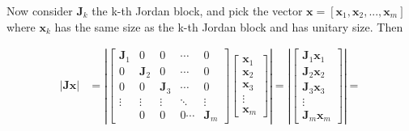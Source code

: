 	Now consider $\mathbf{J}_k$ the k-th Jordan block, and pick the vector $\mathbf{x} = \left[\mathbf{x}_1,\mathbf{x}_2,...,\mathbf{x}_m\right]$ where $\mathbf{x}_k$ has the same size as the k-th Jordan block and has unitary size. Then

\begin{align}
	\left\lvert \mathbf{Jx}\right\rvert &=
	\left\lvert \left[\begin{array}{ccccc} \mathbf{J}_1 & 0 & 0 & \cdots & 0 \\[3mm] 0 & \mathbf{J}_2 & 0 & \cdots & 0 \\[3mm] 0 & 0 & \mathbf{J}_3 & \cdots & 0 \\[3mm] \vdots & \vdots & \vdots & \ddots & \vdots \\[3mm] & 0 & 0 & 0 \cdots & \mathbf{J}_m \end{array}\right] \left[\begin{array}{c} \mathbf{x}_1 \\[3mm] \mathbf{x}_2 \\[3mm] \mathbf{x}_3 \\[3mm] \vdots \\[3mm] \mathbf{x}_m \end{array}\right] \right\rvert =
%
	\left\lvert \left[\begin{array}{c} \mathbf{J}_1\mathbf{x}_1 \\[3mm] \mathbf{J}_2\mathbf{x}_2 \\[3mm] \mathbf{J}_3\mathbf{x}_3 \\[3mm] \vdots \\[3mm] \mathbf{J}_m\mathbf{x}_m \end{array}\right] \right\rvert =  \nonumber\\[3mm]
%

\end{align}
